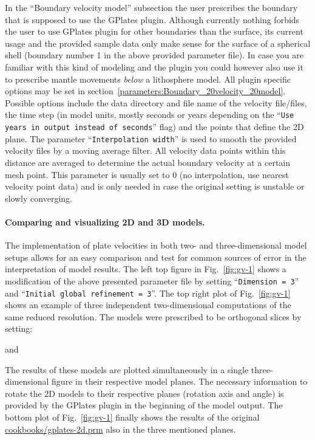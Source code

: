 \documentclass{article}
\begin{document}
In the ``Boundary velocity model'' subsection the user prescribes the boundary that is supposed to
use the GPlates plugin. Although currently nothing forbids the user to use GPlates plugin for other
boundaries than the surface, its current usage and the provided sample data only make sense
for the surface of a spherical shell (boundary number 1 in the above provided parameter file). 
In case you are familiar with this kind of modeling and the plugin you could however also use it to prescribe mantle
movements \textit{below} a lithosphere model. All plugin specific options may be set in 
section~\ref{parameters:Boundary_20velocity_20model}. Possible options include the data directory
and file name of the velocity file/files, the time step (in model units, mostly seconds or years depending on the 
``\texttt{Use years in output instead of seconds}'' flag) and the points that define the 2D plane.
The parameter ``\texttt{Interpolation width}'' is used to smooth the provided velocity files by
a moving average filter. All velocity data points within this distance are averaged to determine the
actual boundary velocity at a certain mesh point. This parameter is usually set to 0 (no interpolation, use
nearest velocity point data) and is only needed in case the original setting is unstable or slowly converging.

\paragraph{Comparing and visualizing 2D and 3D models.}

The implementation of plate velocities in both two- and three-dimensional model
setups allows for an easy comparison and test for common sources of error
in the interpretation of model results. The left top figure in Fig.~\ref{fig:gv-1} 
shows a modification of the above presented parameter file by setting 
``\texttt{Dimension = 3}'' and ``\texttt{Initial global refinement = 3}''. 
The top right plot of Fig.~\ref{fig:gv-1} shows an example of three independent 
two-dimensional computations of the same reduced resolution. The models were prescribed 
to be orthogonal slices by setting:


and



The results of these models are plotted simultaneously in a single three-dimensional figure
in their respective model planes. The necessary information 
to rotate the 2D models to their respective planes (rotation axis and angle) is provided by the 
GPlates plugin in the beginning of the model output.  The bottom plot 
of Fig.~\ref{fig:gv-1} finally shows the results of the original \url{cookbooks/gplates-2d.prm} 
also in the three mentioned planes. 
\end{document}
